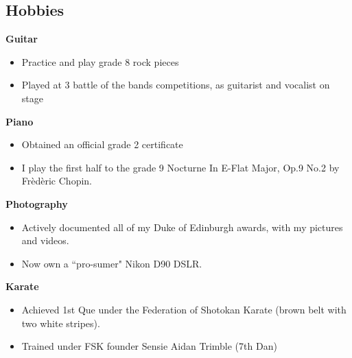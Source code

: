 \documentclass[margin,line]{resume}
\begin{document}
\begin{resume}
    \section{\mysidestyle Hobbies}

    \textbf{Guitar}\vspace{-4mm}\\%
    \begin{itemize}
		\item Practice and play grade 8 rock pieces
		\item Played at 3 battle of the bands competitions, as guitarist and vocalist on stage
    \end{itemize}
    \vspace{-2mm}
    
    \textbf{Piano}\vspace{-4mm}\\%
    \begin{itemize}
		\item Obtained an official grade 2 certificate
		\item I play the first half to the grade 9 Nocturne In E-Flat Major, Op.9 No.2 by Fr\`ed\`eric Chopin.
    \end{itemize}
    \vspace{-2mm}
    
    \textbf{Photography}\vspace{-4mm}\\%
    \begin{itemize}
    		\item Actively documented all of my Duke of Edinburgh awards, with my pictures and videos.
		\item Now own a ``pro-sumer" Nikon D90 DSLR.
    \end{itemize}
    \vspace{-2mm}
    
    \textbf{Karate}\vspace{-4mm}\\%
    \begin{itemize}
    		\item Achieved 1st Que under the Federation of Shotokan Karate (brown belt with two white stripes).
		\item Trained under FSK founder Sensie Aidan Trimble (7th Dan)
    \end{itemize}
    



\end{resume}
\end{document}
